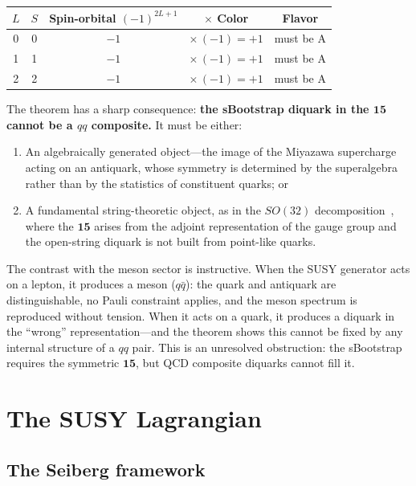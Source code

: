 \documentclass[12pt,a4paper]{article}
\begin{document}
\begin{center}
\begin{tabular}{ccccc}
\toprule
$L$ & $S$ & Spin-orbital $(-1)^{2L+1}$ & $\times$ Color & Flavor \\
\midrule
0 & 0 & $-1$ & $\times\,(-1) = +1$ & must be A \\
1 & 1 & $-1$ & $\times\,(-1) = +1$ & must be A \\
2 & 2 & $-1$ & $\times\,(-1) = +1$ & must be A \\
\bottomrule
\end{tabular}
\end{center}

The theorem has a sharp consequence: \textbf{the sBootstrap
diquark in the $\mathbf{15}$ cannot be a $qq$ composite.} It
must be either:
\begin{enumerate}
\item An algebraically generated object---the image of the
Miyazawa supercharge~\cite{Miyazawa, CattoGursey} acting on
an antiquark, whose symmetry is determined by the superalgebra
rather than by the statistics of constituent quarks; or
\item A fundamental string-theoretic object, as in the $SO(32)$
decomposition~\cite{Rivero2005}, where the $\mathbf{15}$
arises from the adjoint representation of the gauge group and
the open-string diquark is not built from point-like quarks.
\end{enumerate}

The contrast with the meson sector is instructive. When the
SUSY generator acts on a lepton, it produces a meson
($q\bar{q}$): the quark and antiquark are distinguishable,
no Pauli constraint applies, and the meson spectrum is
reproduced without tension. When it acts on a quark, it
produces a diquark in the ``wrong'' representation---and the
theorem shows this cannot be fixed by any internal structure
of a $qq$ pair. This is an unresolved obstruction: the sBootstrap requires
the symmetric $\mathbf{15}$, but QCD composite diquarks cannot
fill it.


\section{The SUSY Lagrangian}
\label{sec:lagrangian}

\subsection{The Seiberg framework}
\end{document}
